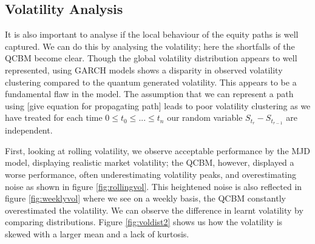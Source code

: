 \documentclass[12pt]{article}
\newcommand{\newp}
    {
    \vskip 0.5cm 
  }
\numberwithin{equation}{section}
\begin{document}
\subsection{Volatility Analysis}
It is also important to analyse if the local behaviour of the equity paths is well 
captured. We can do this by analysing the volatility; here the shortfalls of the 
QCBM become clear. Though the global volatility distribution appears to well 
represented, using GARCH models shows a disparity in observed volatility clustering 
compared to the quantum generated volatility. This appears to be a fundamental 
flaw in the model. The assumption that we can represent a path using [give 
equation for propagating path] leads to poor volatility clustering as we have 
treated for each time $0\leq t_0 \leq ...\leq t_n$ our random variable 
$S_{t_r}-S_{t_{r-1}}$ are independent.
\newp 
First, looking at rolling volatility, we observe acceptable performance by the 
MJD model, displaying realistic market volatility; the QCBM, however, displayed 
a worse performance, often underestimating volatility peaks, and overestimating 
noise as shown in figure \ref{fig:rollingvol}.
This heightened noise is also reflected 
in figure \ref{fig:weeklyvol} where we see on a weekly basis, the QCBM 
constantly overestimated the volatility. We can observe the difference in learnt 
volatility by comparing distributions. Figure \ref{fig:voldist2} shows us how the 
volatility is skewed with a larger mean and a lack of kurtosis. 
\end{document}
